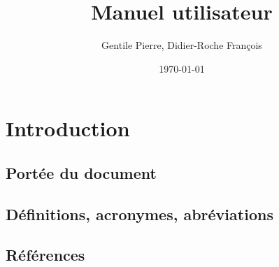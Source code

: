 \documentclass{article}
\author{Gentile Pierre, Didier-Roche François}
\date{\today}
\title{Manuel utilisateur}
\begin{document}
\maketitle

\newpage
\tableofcontents
\newpage


\section{Introduction}

\subsection{Portée du document}

\subsection{Définitions, acronymes, abréviations}

\subsection{Références}
\end{document}
